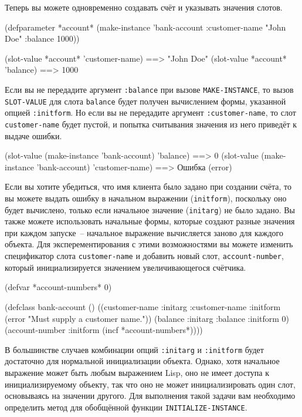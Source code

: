Теперь вы можете одновременно создавать счёт и указывать значения слотов.

\begin{myverb}
(defparameter *account*
  (make-instance 'bank-account :customer-name "John Doe" :balance 1000))

  (slot-value *account* 'customer-name) ==> "John Doe"
  (slot-value *account* 'balance)       ==> 1000
\end{myverb}

Если вы не передадите аргумент \lstinline{:balance} при вызове \lstinline{MAKE-INSTANCE}, то вызов
\lstinline{SLOT-VALUE} для слота \lstinline{balance} будет получен вычислением формы, указанной
опцией \lstinline{:initform}.  Но если вы не передадите аргумент \lstinline{:customer-name}, то
слот \lstinline{customer-name} будет пустой, и попытка считывания значения из него приведёт к
выдаче ошибки.

\begin{myverb}
  (slot-value (make-instance 'bank-account) 'balance)       ==> 0
  (slot-value (make-instance 'bank-account) 'customer-name) ==> Ошибка (error)
\end{myverb}

Если вы хотите убедиться, что имя клиента было задано при создании счёта, то вы можете
выдать ошибку в начальном выражении (\lstinline{initform}), поскольку оно будет вычислено,
только если начальное значение (\lstinline{initarg}) не было задано.  Вы также можете
использовать начальные формы, которые создают разные значения при каждом запуске~--
начальное выражение вычисляется заново для каждого объекта.  Для эксперементирования с
этими возможностями вы можете изменить спецификатор слота \lstinline{customer-name} и добавить
новый слот, \lstinline{account-number}, который инициализируется значением увеличивающегося
счётчика.

\begin{myverb}
(defvar *account-numbers* 0)

(defclass bank-account ()
  ((customer-name
    :initarg :customer-name
    :initform (error "Must supply a customer name."))
   (balance
    :initarg :balance
    :initform 0)
   (account-number
    :initform (incf *account-numbers*))))
\end{myverb}

В большинстве случаев комбинации опций \lstinline{:initarg} и \lstinline{:initform} будет
достаточно для нормальной инициализации объекта.  Однако, хотя начальное выражение может
быть любым выражением Lisp, оно не имеет доступа к инициализируемому объекту, так что оно
не может инициализировать один слот, основываясь на значении другого.  Для выполнения
такой задачи вам необходимо определить метод для обобщённой функции
\lstinline{INITIALIZE-INSTANCE}.

